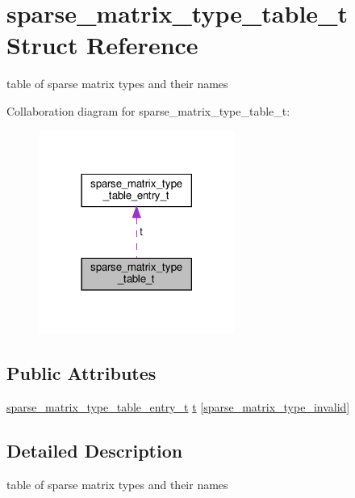 \hypertarget{structsparse__matrix__type__table__t}{}\section{sparse\+\_\+matrix\+\_\+type\+\_\+table\+\_\+t Struct Reference}
\label{structsparse__matrix__type__table__t}


table of sparse matrix types and their names  




Collaboration diagram for sparse\+\_\+matrix\+\_\+type\+\_\+table\+\_\+t\+:\nopagebreak
\begin{figure}[H]
\begin{center}
\leavevmode
\includegraphics[width=182pt]{structsparse__matrix__type__table__t__coll__graph}
\end{center}
\end{figure}
\subsection*{Public Attributes}
\begin{DoxyCompactItemize}
\item 
\hyperlink{structsparse__matrix__type__table__entry__t}{sparse\+\_\+matrix\+\_\+type\+\_\+table\+\_\+entry\+\_\+t} \hyperlink{structsparse__matrix__type__table__t_a190c83be8b6111d25205a05ed0b23050}{t} \mbox{[}\hyperlink{spmv_8cc_a43a568fb26bc32aeaad07769cc524c45adbd59ebb0cfb220b9035a64fc2ed28dc}{sparse\+\_\+matrix\+\_\+type\+\_\+invalid}\mbox{]}
\end{DoxyCompactItemize}


\subsection{Detailed Description}
table of sparse matrix types and their names 

